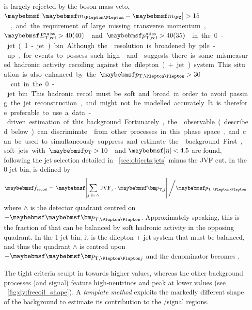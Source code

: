\DYll is largely rejected by the \PZ boson mass veto, 
\unit{$\mods{\mll - \mZ} > 15$}{\GeV}, and the requirement of large missing transverse 
momentum, \unit{$\calometrel > 40 (40)$}{\GeV} and \unit{$\trackmetrel > 40 (35)$}{\GeV} in 
the 0-jet (1-jet) bin. Although the \met resolution is broadened by pile-up, for 
events to possess such high \calometrel and \trackmetrel suggests there is some mismeasured 
hadronic activity recoiling against the dilepton (+ jet) system. This situation is also 
enhanced by the \unit{$\ptll > 30$}{\GeV} cut in the 0-jet bin.

This hadronic recoil must be soft and broad in order to avoid passing the jet 
reconstruction, and might not be modelled accurately. It is therefore preferable to use 
a data-driven estimation of this background. Fortunately, the \frecoil observable 
(described below) can discriminate \DYll from other processes in this phase space, and 
can be used to simultaneously suppress and estimate the \DYll background.

First, soft jets with \unit{$\pt > 10$}{\GeV} and $\mods{\eta} < 4.5$ are found, 
following the jet selection detailed in \Section~\ref{sec:objects:jets} minus the JVF 
cut. In the 0-jet bin, \frecoil is defined by
\begin{equation}
	\frecoil = \left. \mods{\sum\limits_{j\text{ in }\wedge} \text{JVF}_{j} \cdot \bvec{p}_{\text{T,}j}} \, \middle/ \ptll \right.
	\label{eq:dy:frecoil}
\end{equation}
where $\wedge$ is the detector quadrant centred on $-\ptllvec$. Approximately speaking, 
this is the fraction of \ptll that can be balanced by soft hadronic activity in the 
opposing quadrant. In the 1-jet bin, it is the dilepton + jet system that must be balanced, 
and thus the quadrant $\wedge$ is centred upon $-\ptlljvec$ and the denominator becomes 
\ptllj.

The tight \met criteria sculpt \frecoil in \DYll towards higher values, whereas the other 
background processes (and signal) feature high-\pt neutrinos and peak at lower values 
(see \Figure~\ref{fig:dy:frecoil_shape}). A \textit{template method} exploits the 
markedly different \frecoil shape of the \DYll background to estimate its contribution to 
the \eech/\mmch signal regions.


